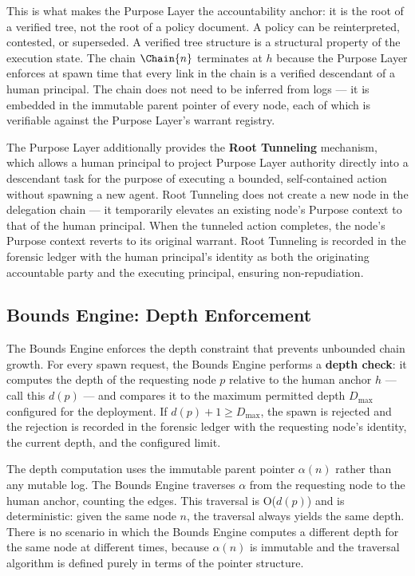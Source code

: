 This is what makes the Purpose Layer the accountability anchor: it is the root of a verified tree, not the root of a policy document. A policy can be reinterpreted, contested, or superseded. A verified tree structure is a structural property of the execution state. The chain $\Chain{n}$ terminates at $h$ because the Purpose Layer enforces at spawn time that every link in the chain is a verified descendant of a human principal. The chain does not need to be inferred from logs — it is embedded in the immutable parent pointer of every node, each of which is verifiable against the Purpose Layer's warrant registry.

The Purpose Layer additionally provides the \textbf{Root Tunneling} mechanism, which allows a human principal to project Purpose Layer authority directly into a descendant task for the purpose of executing a bounded, self-contained action without spawning a new agent. Root Tunneling does not create a new node in the delegation chain — it temporarily elevates an existing node's Purpose context to that of the human principal. When the tunneled action completes, the node's Purpose context reverts to its original warrant. Root Tunneling is recorded in the forensic ledger with the human principal's identity as both the originating accountable party and the executing principal, ensuring non-repudiation.

\subsection{Bounds Engine: Depth Enforcement}
\label{sec:bounds-engine-depth-enforcement}

The Bounds Engine enforces the depth constraint that prevents unbounded chain growth. For every spawn request, the Bounds Engine performs a \textbf{depth check}: it computes the depth of the requesting node $p$ relative to the human anchor $h$ — call this $d(p)$ — and compares it to the maximum permitted depth $D_{\max}$ configured for the deployment. If $d(p) + 1 \geq D_{\max}$, the spawn is rejected and the rejection is recorded in the forensic ledger with the requesting node's identity, the current depth, and the configured limit.

The depth computation uses the immutable parent pointer $\alpha(n)$ rather than any mutable log. The Bounds Engine traverses $\alpha$ from the requesting node to the human anchor, counting the edges. This traversal is O($d(p)$) and is deterministic: given the same node $n$, the traversal always yields the same depth. There is no scenario in which the Bounds Engine computes a different depth for the same node at different times, because $\alpha(n)$ is immutable and the traversal algorithm is defined purely in terms of the pointer structure.

